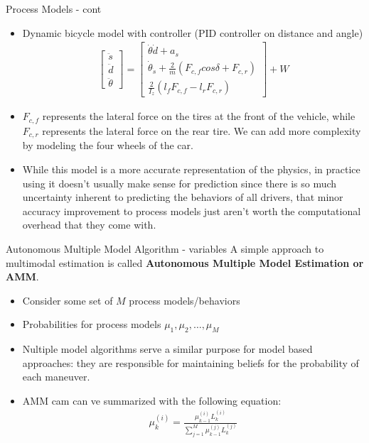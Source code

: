 \documentclass[10pt,mathserif]{beamer}
\begin{document}
\begin{frame}{Process Models - cont}
\begin{itemize}
\item Dynamic bicycle model with controller (PID controller on distance and angle)
\begin{align}
\begin{bmatrix}
\ddot{s} \\ \ddot{d} \\ \ddot{\theta}
\end{bmatrix} = 
\begin{bmatrix}
\dot{\theta}\dot{d} + a_s \\ \dot{\theta}_{\dot{s}} + \frac{2}{m}(F_{c,f}cos\delta + F_{c,r})\\
\frac{2}{I_z}(l_fF_{c,f} - l_rF_{c,r})
\end{bmatrix} + W
\end{align}
\item $F_{c,f}$ represents the lateral force on the tires at the front of the vehicle, while $F_{c,r}$ represents the lateral force on the rear tire. We can add more complexity by modeling the four wheels of the car.
\item While this model is a more accurate representation of the physics, in practice using it doesn't usually make sense for prediction since there is so much uncertainty inherent to predicting the behaviors of all drivers, that minor accuracy improvement to process models just aren't worth the computational overhead that they come with.  
\end{itemize}
\end{frame}


\begin{frame}{Autonomous Multiple Model Algorithm - variables}
A simple approach to multimodal estimation is called \textbf{Autonomous Multiple Model Estimation or AMM}.
\begin{itemize}
\item Consider some set of $M$ process models/behaviors
\item Probabilities for process models $\mu_1, \mu_2, \dots, \mu_M$
\item Nultiple model algorithms serve a similar purpose for model based approaches: they are 
responsible for maintaining beliefs for the probability of each maneuver.
\item AMM cam can ve summarized with the following equation:
\begin{align}
\mu_k^{(i)}= \frac{\mu_{k-1}^{(i)}L_{k}^{(i)}}{\sum_{j=1}^M\mu_{k-1}^{(j)}L_k^{(j)}}
\end{align}
\end{itemize}
\end{frame}
\end{document}
